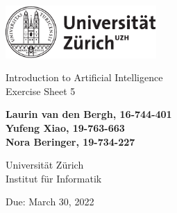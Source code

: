 \documentclass[12pt]{article}
\begin{document}
\begin{titlepage}
\includegraphics[height=20mm]{../images/uzh_logo}\\

\begin{flushleft}

\vspace{2cm}

{\Large Introduction to Artificial Intelligence\\Exercise Sheet 5}\\

\vspace{4cm}

\textbf{Laurin van den Bergh, 16-744-401\\Yufeng Xiao, 19-763-663\\Nora Beringer, 19-734-227}\\

\vspace{2cm}

Universität Zürich\\
Institut für Informatik

\vfill Due: March 30, 2022

\vspace{3cm}


\end{flushleft}
\end{titlepage}

\newpage
\end{document}
